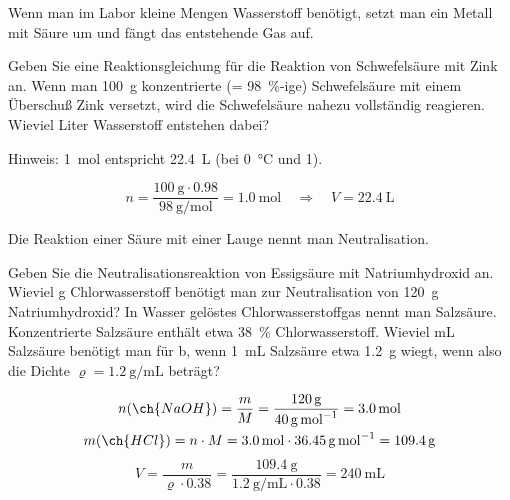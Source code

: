 \documentclass[DIV11]{scrartcl}
\begin{document}
\begin{question}[name=Wasserstoffdarstellung]
Wenn man im Labor kleine Mengen Wasserstoff benötigt, setzt man ein Metall mit
Säure um und fängt das entstehende Gas auf.
\begin{tasks}
  \task Geben Sie eine Reaktionsgleichung für die Reaktion von Schwefelsäure
    mit Zink an.
  \task Wenn man \SI{100}{\gram} konzentrierte (= \SI{98}{\percent}-ige)
    Schwefelsäure mit einem Überschuß Zink versetzt, wird die Schwefelsäure
    nahezu vollständig reagieren. Wieviel Liter Wasserstoff entstehen dabei?

    Hinweis: \SI{1}{\mole} entspricht \SI{22.4}{\liter} (bei \SI{0}{\celsius}
    und \SI{1}{\atm}).
\end{tasks}
\end{question}
\begin{solution}[name=Wasserstoffdarstellung]
\begin{tasks}
  \task {}
  \task
    \[
      n = \frac{\SI{100}{\gram}\cdot 0.98}{\SI{98}{\gram\per\mole}}
      = \SI{1.0}{\mole}
      \quad \Rightarrow\quad
      V = \SI{22.4}{\liter}
    \]
\end{tasks}
\end{solution}

\begin{question}[name=Neutralisation]
Die Reaktion einer Säure mit einer Lauge nennt man Neutralisation.
\begin{tasks}
  \task Geben Sie die Neutralisationsreaktion von Essigsäure mit
    Natriumhydroxid an.
  \task Wieviel \si{\gram} Chlorwasserstoff benötigt man zur Neutralisation
    von \SI{120}{\gram} Natriumhydroxid?
  \task In Wasser gelöstes Chlorwasserstoffgas nennt man Salzsäure.
    Konzentrierte Salzsäure enthält etwa \SI{38}{\percent}
    Chlorwasserstoff. Wieviel \si{\milli\liter} Salzsäure benötigt man für b,
    wenn \SI{1}{\milli\liter} Salzsäure etwa \SI{1.2}{\gram} wiegt, wenn also
    die Dichte $\varrho = \SI{1.2}{\gram\per\milli\liter}$ beträgt? 
\end{tasks}
\end{question}
\begin{solution}[name=Neutralisation]
\begin{tasks}
  \task {}
  \task
    \begin{gather*}
      n(\ch{NaOH}) = \frac{m}{M}
                   = \frac{\SI{120}{\gram}}{\SI{40}{\gram\per\mole}}
                   = \SI{3.0}{\mole} \\
      m(\ch{HCl})  = n \cdot M
                   = \SI{3.0}{\mole} \cdot \SI{36.45}{\gram\per\mole}
                   = \SI{109.4}{\gram}
    \end{gather*}
  \task
    \[
      V = \frac{m}{\varrho\cdot 0.38}
        = \frac{\SI{109.4}{\gram}}{\SI{1.2}{\gram\per\milli\liter}\cdot0.38}
        = \SI{240}{\milli\liter}
    \]
\end{tasks}
\end{solution}
\end{document}

